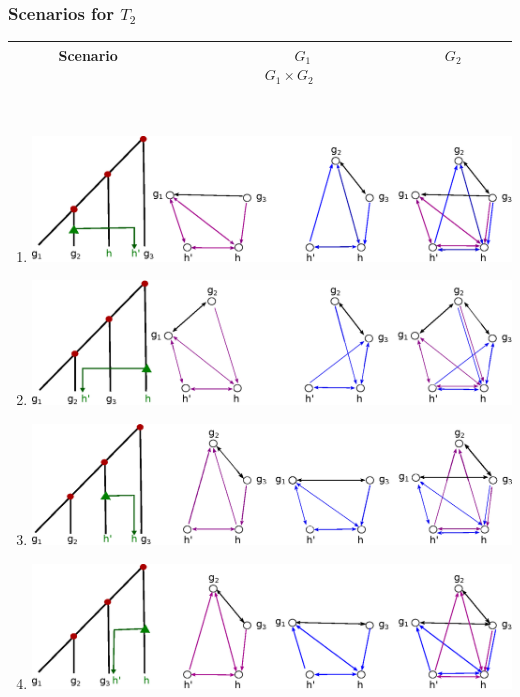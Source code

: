 \documentclass[10pt,a4paper,notitlepage]{article}
\begin{document}
	\subsubsection{Scenarios for $T_2$}		
	\begin{tabular}[h]{|c|}
		\hline	
		Scenario 
		$\;\;\;\;\;\;\;\;\;\;\;\;\;\;\;\;\;\;\;\;\;\;\;\;\;\;\;\;\;\;\;\;\;\;\;\;\;\;\;\;\;\;\;\; {G}_1$
		$\;\;\;\;\;\;\;\;\;\;\;\;\;\;\;\;\;\;\;\;\;\;\;\;\;\;\;\;\;\;\;\;\; {G}_2$ 
		$\;\;\;\;\;\;\;\;\;\;\;\;\;\;\;\;\;\;\;\;\;\;\;\;\;\;\; {G}_1 \times {G}_2  \;\;\;\;\;\;\;\;\;\;\;\;$\\		
		\hline
	\end{tabular}
	\\
\begin{enumerate}
\item 
		\includegraphics[scale=0.7]{Images/eps/fig1}\\
\item
		\includegraphics[scale=0.7]{Images/eps/fig2}\\
\item
		\includegraphics[scale=0.7]{Images/eps/fig3}\\
\item
		\includegraphics[scale=0.7]{Images/eps/fig4}\\

\end{enumerate}
\end{document}

